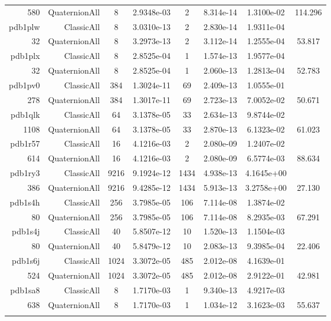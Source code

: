 \begin{xltabular}{\textwidth}{r|rcS[table-format=1.4e+2]cS[table-format=1.3e+2]S[table-format=1.4e+2]S[table-format=-1.3]}
580 & QuaternionAll & 8 & 2.9348e-03 & 2 & 8.314e-14 & 1.3100e-02 & 114.296\\  \addlinespace
pdb1plw & ClassicAll & 8 & 3.0310e-13 & 2 & 2.830e-14 & 1.9311e-04 & \\
32 & QuaternionAll & 8 & 3.2973e-13 & 2 & 3.112e-14 & 1.2555e-04 & 53.817\\  \addlinespace
pdb1plx & ClassicAll & 8 & 2.8525e-04 & 1 & 1.574e-13 & 1.9577e-04 & \\
32 & QuaternionAll & 8 & 2.8525e-04 & 1 & 2.060e-13 & 1.2813e-04 & 52.783\\  \addlinespace
pdb1pv0 & ClassicAll & 384 & 1.3024e-11 & 69 & 2.409e-13 & 1.0555e-01 & \\
278 & QuaternionAll & 384 & 1.3017e-11 & 69 & 2.723e-13 & 7.0052e-02 & 50.671\\  \addlinespace
pdb1qlk & ClassicAll & 64 & 3.1378e-05 & 33 & 2.634e-13 & 9.8744e-02 & \\
1108 & QuaternionAll & 64 & 3.1378e-05 & 33 & 2.870e-13 & 6.1323e-02 & 61.023\\  \addlinespace
pdb1r57 & ClassicAll & 16 & 4.1216e-03 & 2 & 2.080e-09 & 1.2407e-02 & \\
614 & QuaternionAll & 16 & 4.1216e-03 & 2 & 2.080e-09 & 6.5774e-03 & 88.634\\  \addlinespace
pdb1ry3 & ClassicAll & 9216 & 9.1924e-12 & 1434 & 4.938e-13 & 4.1645e+00 & \\
386 & QuaternionAll & 9216 & 9.4285e-12 & 1434 & 5.913e-13 & 3.2758e+00 & 27.130\\  \addlinespace
pdb1s4h & ClassicAll & 256 & 3.7985e-05 & 106 & 7.114e-08 & 1.3874e-02 & \\
80 & QuaternionAll & 256 & 3.7985e-05 & 106 & 7.114e-08 & 8.2935e-03 & 67.291\\  \addlinespace
pdb1s4j & ClassicAll & 40 & 5.8507e-12 & 10 & 1.520e-13 & 1.1504e-03 & \\
80 & QuaternionAll & 40 & 5.8479e-12 & 10 & 2.083e-13 & 9.3985e-04 & 22.406\\  \addlinespace
pdb1s6j & ClassicAll & 1024 & 3.3072e-05 & 485 & 2.012e-08 & 4.1639e-01 & \\
524 & QuaternionAll & 1024 & 3.3072e-05 & 485 & 2.012e-08 & 2.9122e-01 & 42.981\\  \addlinespace
pdb1sa8 & ClassicAll & 8 & 1.7170e-03 & 1 & 9.340e-13 & 4.9217e-03 & \\
638 & QuaternionAll & 8 & 1.7170e-03 & 1 & 1.034e-12 & 3.1623e-03 & 55.637\\  \addlinespace

\end{xltabular}
